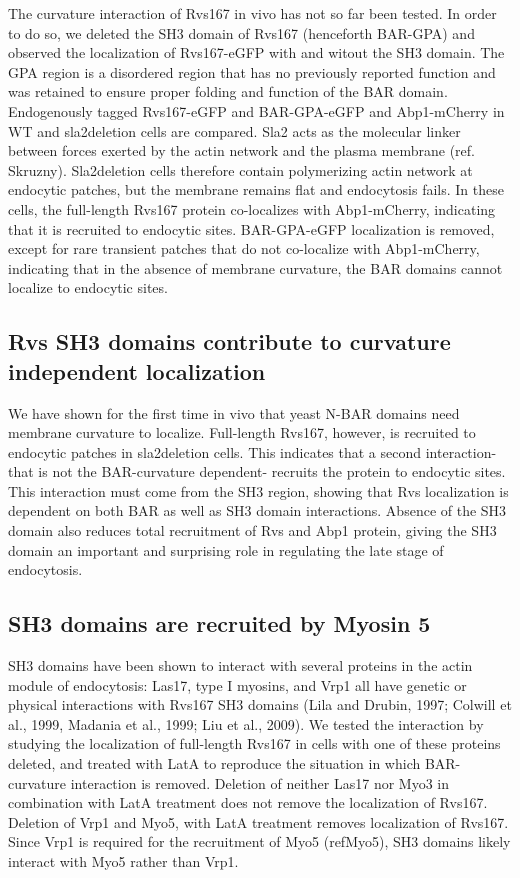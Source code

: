 \documentclass[9pt,lineno]{elife}
\begin{document}
The curvature interaction of Rvs167 in vivo has not so far been tested. In order to do so, we deleted the SH3 domain of Rvs167 (henceforth BAR-GPA) and observed the localization of Rvs167-eGFP with and witout the SH3 domain. The GPA region is a disordered region that has no previously reported function and was retained to ensure proper folding and function of the BAR domain. Endogenously tagged Rvs167-eGFP and BAR-GPA-eGFP and Abp1-mCherry in WT and sla2deletion cells are compared. Sla2 acts as the molecular linker between forces exerted by the actin network and the plasma membrane (ref. Skruzny). Sla2deletion cells therefore contain polymerizing actin network at endocytic patches, but the membrane remains flat and endocytosis fails. In these cells, the full-length Rvs167 protein co-localizes with Abp1-mCherry, indicating that it is recruited to endocytic sites. BAR-GPA-eGFP localization is removed, except for rare transient patches that do not co-localize with Abp1-mCherry, indicating that in the absence of membrane curvature, the BAR domains  cannot localize to endocytic sites. 




\subsection{Rvs SH3 domains contribute to curvature independent localization}
We have shown for the first time in vivo that yeast N-BAR domains need membrane curvature to localize. Full-length Rvs167, however, is recruited to endocytic patches in sla2deletion cells. This indicates that a second interaction- that is not the BAR-curvature dependent- recruits the protein to endocytic sites. This interaction must come from the SH3 region, showing that Rvs localization is dependent on both BAR as well as SH3 domain interactions. Absence of the SH3 domain also reduces total recruitment of Rvs and Abp1 protein, giving the SH3 domain an important and surprising role in regulating the late stage of endocytosis. 

\subsection{SH3 domains are recruited by Myosin 5}
SH3 domains have been shown to interact with several proteins in the actin module of endocytosis: Las17, type I myosins, and Vrp1 all have genetic or physical interactions with Rvs167 SH3 domains (Lila and Drubin, 1997; Colwill et al., 1999, Madania et al., 1999; Liu et al., 2009). 
We tested the interaction by studying the localization of full-length Rvs167 in cells with one of these proteins deleted, and treated with LatA to reproduce the situation in which BAR-curvature interaction is removed. 
Deletion of neither Las17 nor Myo3 in combination with LatA treatment does not remove the localization of Rvs167. Deletion of Vrp1 and Myo5, with LatA treatment removes localization of Rvs167. Since Vrp1 is required for the recruitment of Myo5 (refMyo5), SH3 domains likely interact with Myo5 rather than Vrp1. 
\end{document}
